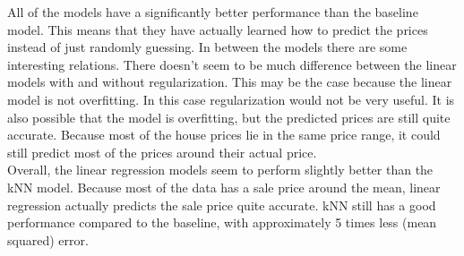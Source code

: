 \documentclass[a4paper,11pt]{article}
\begin{document}
All of the models have a significantly better performance than the baseline model. This means that they have actually learned how to predict the prices instead of just randomly guessing. In between the models there are some interesting relations. There doesn’t seem to be much difference between the linear models with and without regularization. This may be the case because the linear model is not overfitting. In this case regularization would not be very useful. It is also possible that the model is overfitting, but the predicted prices are still quite accurate. Because most of the house prices lie in the same price range, it could still predict most of the prices around their actual price. \\

Overall, the linear regression models seem to perform slightly better than the kNN model. Because most of the data has a sale price around the mean, linear regression actually predicts the sale price quite accurate. kNN still has a good performance compared to the baseline, with approximately 5 times less (mean squared) error. 


\clearpage


\end{document}
